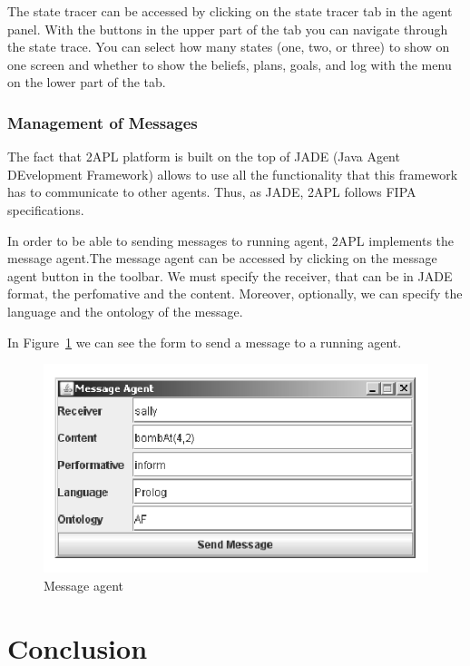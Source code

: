 \documentclass[a4paper]{article}
\begin{document}
The state tracer can be accessed by clicking on the state tracer tab in the agent panel. With the buttons in the upper part of the tab you can navigate through the state trace. You can select how many states (one, two, or three) to show on one screen and whether to show the beliefs, plans, goals, and log with the menu on the lower part of the tab.

\subsubsection{Management of Messages}

The fact that 2APL platform is built on the top of JADE (Java Agent DEvelopment Framework) allows to use all the functionality that this framework has to communicate to other agents. Thus, as JADE, 2APL follows FIPA specifications.

In order to be able to sending messages to running agent, 2APL implements the message agent.The message agent can be accessed by clicking on the message agent button in the toolbar. We must specify the receiver, that can be in JADE format, the perfomative and the content. Moreover, optionally, we can specify the language and the ontology of the message.

In Figure~\ref{fig:message_agent} we can see the form to send a message to a running agent.

\begin{figure}[htp]
\centering
\includegraphics[keepaspectratio,scale=0.65]{fig/messageagent.png}
\caption{Message agent}
\label{fig:message_agent}
\end{figure}

\section{Conclusion}\label{sec:concl} 
\end{document}
